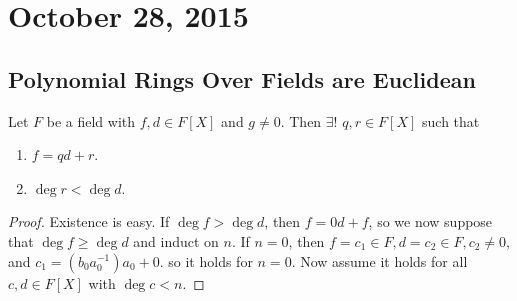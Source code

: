 \section{October 28, 2015}

\subsection{Polynomial Rings Over Fields are Euclidean}

\begin{thm}
Let $F$ be a field with $f, d \in F[X]$ and $g \neq 0$. Then $\exists !$
$q, r \in F[X]$ such that
\begin{enumerate}
\item $f = qd + r$.
\item $\deg r < \deg d$.
\end{enumerate}
\end{thm}

\begin{proof}
Existence is easy. If $\deg f > \deg d$, then $f = 0d + f$, so we now
suppose that $\deg f \geq \deg d$ and induct on $n$. If $n = 0$, then $f
= c_1 \in F, d = c_2 \in F, c_2 \neq 0$, and $c_1 = \left(b_0
a_0^{-1}\right) a_0 + 0$. so it holds for $n = 0$. Now assume it holds
for all $c, d \in F[X]$ with $\deg c < n$.
\end{proof}
